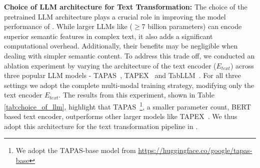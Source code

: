 

\noindent \textbf{Choice of LLM architecture for Text Transformation:}
The choice of the pretrained LLM architecture plays a crucial role in improving the model performance of \tabglm. 
While larger LLMs like \cite{sun2023gpt, tabllm, tapex} ($\geq$7 billion parameters) can encode superior semantic features in complex text, it also adds a significant computational overhead. Additionally, their benefits may be negligible when dealing with simpler semantic content.
To address this trade off, we conducted an ablation experiment by varying the architecture of the text encoder ($E_{text}$) across three popular LLM models - TAPAS~\cite{tapas}, TAPEX~\cite{tapex} and TabLLM~\cite{tabllm}.
For all three settings we adopt the complete multi-modal training strategy, modifying only the text encoder $E_{text}$. 
The results from this experiment, shown in Table \ref{tab:choice_of_llm}, highlight that TAPAS~\footnote{We adopt the TAPAS-base model from \url{https://huggingface.co/google/tapas-base}}, a smaller parameter count, BERT~\cite{devlin2018bert} based text encoder, outperforms other larger models like TAPEX~\cite{tapex}. We thus adopt this architecture for the text transformation pipeline in \tabglm.
